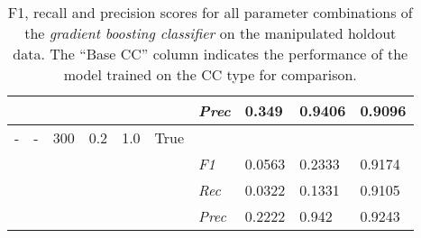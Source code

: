 \begin{table}[H]
\begin{tabularx}{\textwidth}{XXXXXX|X|X|X|X}
    & & & & & & \textit{Prec} & 0.349 & 0.9406 & 0.9096 \\ \midrule
    - & - & 300 & 0.2 & 1.0 &True & & & & \\
    & & & & & & \textit{F1} & 0.0563 & 0.2333   & 0.9174     \\
    & & & & & & \textit{Rec} &  0.0322 & 0.1331 & 0.9105   \\
    & & & & & & \textit{Prec} & 0.2222 & 0.942 & 0.9243 \\ \midrule
    \end{tabularx}
    \caption{F1, recall and precision scores for all parameter combinations of the \textit{gradient boosting classifier} on the manipulated holdout data. The \enquote{Base CC} column indicates the performance of the model trained on the CC type for comparison. }
    \label{tab:rq3_gradient_boosting_classifier}
    \end{table}
    

